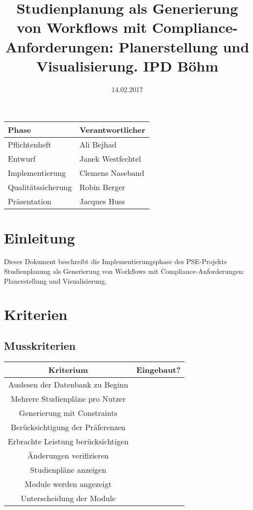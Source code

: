 \documentclass[parskip=full]{scrartcl}
\title{Studienplanung als Generierung von Workflows mit Compliance-Anforderungen: Planerstellung und Visualisierung.
	\newline IPD Böhm}
\date{14.02.2017}
\begin{document}
	
	\maketitle
	\vfill
	\begin{center}
		\begin{tabular}{| l | l |}
			\hline
			\textbf{Phase} & \textbf{Verantwortlicher} \\
			\hline
			Pflichtenheft & Ali Bejhad \\
			Entwurf & Janek Westfechtel \\
			Implementierung & Clemens Naseband \\
			Qualitätssicherung & Robin Berger \\
			Präsentation  & Jacques Huss \\
			\hline
		\end{tabular}
	\end{center}
	
	\pagebreak
	\tableofcontents
	
	\section{Einleitung}
		Dieses Dokument beschreibt die Implementierungsphase des PSE-Projekts \glqq Studienplanung als Generierung von Workflows mit Compliance-Anforderungen: Planerstellung und Visualisierung\grqq.
	
	\section{Kriterien}
	\subsection{Musskriterien}
	\begin{tabular}{|c|c|}
		\hline 
		\textbf{Kriterium} & \textbf{Eingebaut?} \\ 
		\hline 
		Auslesen der Datenbank zu Beginn &  \checkmark \\ 
		Mehrere Studienpläne pro Nutzer & \checkmark \\ 
		Generierung mit Constraints &  \checkmark \\ 
		Berücksichtigung der Präferenzen & \checkmark \\ 
		Erbrachte Leistung berücksichtigen & \checkmark \\ 
		Änderungen verifizieren & \checkmark \\ 
		Studienpläne anzeigen & \checkmark \\ 
		Module werden angezeigt & \checkmark \\ 
		Unterscheidung der Module &  \checkmark \\ 
		\hline 
	\end{tabular} 
	
\end{document}
